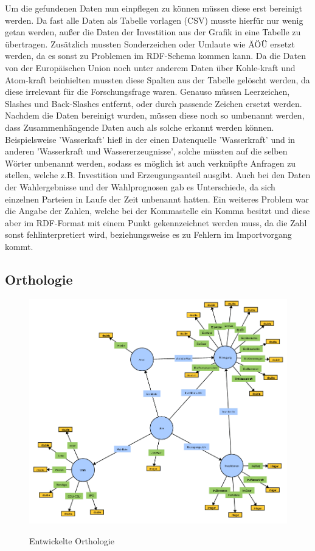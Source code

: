 \documentclass[12pt]{article}
\begin{document}
Um die gefundenen Daten nun einpflegen zu können müssen diese erst bereinigt werden. Da fast alle Daten als Tabelle vorlagen (CSV) musste hierfür nur wenig getan werden, außer die Daten der Investition aus der Grafik in eine Tabelle zu übertragen. Zusätzlich mussten Sonderzeichen oder Umlaute wie ÄÖÜ ersetzt werden, da es sonst zu Problemen im RDF-Schema kommen kann. Da die Daten von der Europäischen Union noch unter anderem Daten über Kohle-kraft und Atom-kraft beinhielten mussten diese Spalten aus der Tabelle gelöscht werden, da diese irrelevant für die Forschungsfrage waren. Genauso müssen Leerzeichen, Slashes und Back-Slashes entfernt, oder durch passende Zeichen ersetzt werden. Nachdem die Daten bereinigt wurden, müssen diese noch so umbenannt werden, dass Zusammenhängende Daten auch als solche erkannt werden können. Beispielsweise 'Wasserkaft' hieß in der einen Datenquelle 'Wasserkraft' und in anderen 'Wasserkraft und Wassererzeugnisse', solche müssten auf die selben Wörter unbenannt werden, sodass es möglich ist auch verknüpfte Anfragen zu stellen, welche z.B. Investition und Erzeugungsanteil ausgibt. Auch bei den Daten der Wahlergebnisse und der Wahlprognosen gab es Unterschiede, da sich einzelnen Parteien in Laufe der Zeit unbenannt hatten. Ein weiteres Problem war die Angabe der Zahlen, welche bei der Kommastelle ein Komma besitzt und diese aber im RDF-Format mit einem Punkt gekennzeichnet werden muss, da die Zahl sonst fehlinterpretiert wird, beziehungsweise es zu Fehlern im Importvorgang kommt. 

        \subsection{Orthologie}
    
\begin{figure}[!ht]
    \caption{Entwickelte Orthologie}
    \centering
    \includegraphics[width=1.2\textwidth]{images/orthologie.png}
    \label{fig:orthologie}
\end{figure}
\end{document}
